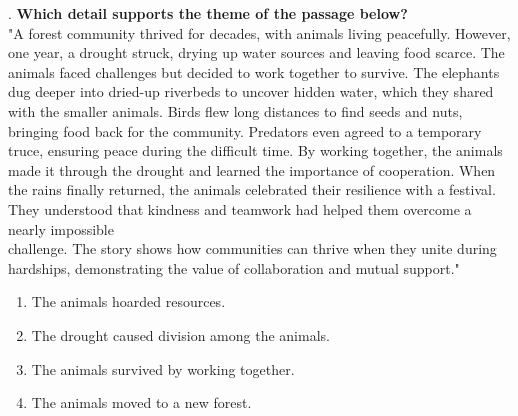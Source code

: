 \documentclass[12pt]{article}
\begin{document}
\vspace{1em}
. \textbf{Which detail supports the theme of the passage below?}\\
"A forest community thrived for decades, with animals living peacefully. However, one year, a drought struck, drying up water sources and leaving food scarce. The animals faced challenges but decided to work together to survive. The elephants dug deeper into dried-up riverbeds to uncover hidden water, which they shared with the smaller animals. Birds flew long distances to find seeds and nuts, bringing food back for the community. Predators even agreed to a temporary truce, ensuring peace during the difficult time. By working together, the animals made it through the drought and learned the importance of cooperation. When the rains finally returned, the animals celebrated their resilience with a festival. They understood that kindness and teamwork had helped them overcome a nearly impossible \\challenge. The story shows how communities can thrive when they unite during hardships, demonstrating the value of collaboration and mutual support."\\
\begin{enumerate}[label=\Alph*.]
    \item The animals hoarded resources.  
    \item The drought caused division among the animals.  
    \item The animals survived by working together.  
    \item The animals moved to a new forest.  
\end{enumerate}

\vspace{1em}
\end{document}
